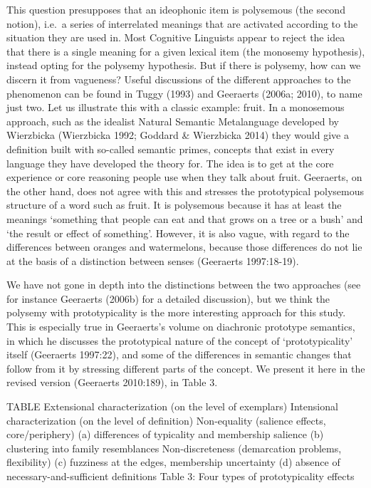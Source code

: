 \documentclass[12pt,article,oneside]{memoir}
\theoremstyle{definition}
\theoremstyle{definition}
\theoremstyle{definition}
\theoremstyle{remark}
\begin{document}
This question presupposes that an ideophonic item is polysemous (the
second notion), i.e.~a series of interrelated meanings that are
activated according to the situation they are used in. Most Cognitive
Linguists appear to reject the idea that there is a single meaning for a
given lexical item (the monosemy hypothesis), instead opting for the
polysemy hypothesis. But if there is polysemy, how can we discern it
from vagueness? Useful discussions of the different approaches to the
phenomenon can be found in Tuggy (1993) and Geeraerts (2006a; 2010), to
name just two. Let us illustrate this with a classic example: fruit. In
a monosemous approach, such as the idealist Natural Semantic
Metalanguage developed by Wierzbicka (Wierzbicka 1992; Goddard \&
Wierzbicka 2014) they would give a definition built with so-called
semantic primes, concepts that exist in every language they have
developed the theory for. The idea is to get at the core experience or
core reasoning people use when they talk about fruit. Geeraerts, on the
other hand, does not agree with this and stresses the prototypical
polysemous structure of a word such as fruit. It is polysemous because
it has at least the meanings `something that people can eat and that
grows on a tree or a bush' and `the result or effect of something'.
However, it is also vague, with regard to the differences between
oranges and watermelons, because those differences do not lie at the
basis of a distinction between senses (Geeraerts 1997:18-19).

We have not gone in depth into the distinctions between the two
approaches (see for instance Geeraerts (2006b) for a detailed
discussion), but we think the polysemy with prototypicality is the more
interesting approach for this study. This is especially true in
Geeraerts's volume on diachronic prototype semantics, in which he
discusses the prototypical nature of the concept of `prototypicality'
itself (Geeraerts 1997:22), and some of the differences in semantic
changes that follow from it by stressing different parts of the concept.
We present it here in the revised version (Geeraerts 2010:189), in Table
3.

TABLE Extensional characterization (on the level of exemplars)
Intensional characterization (on the level of definition) Non-equality
(salience effects, core/periphery) (a) differences of typicality and
membership salience (b) clustering into family resemblances
Non-discreteness (demarcation problems, flexibility) (c) fuzziness at
the edges, membership uncertainty (d) absence of
necessary-and-sufficient definitions Table 3: Four types of
prototypicality effects
\end{document}
